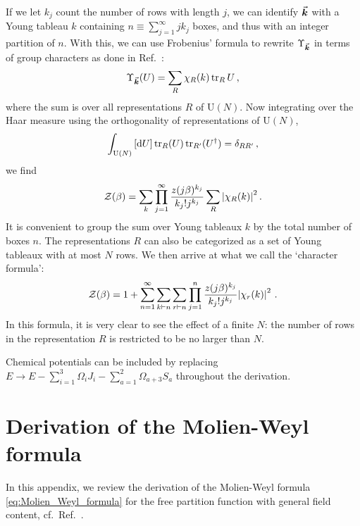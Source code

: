 \documentclass[a4paper,11pt]{article}
\begin{document}
If we let $k_j$ count the number of rows with length $j$, we can identify $\va*{k}$ with a Young tableau $k$ containing $n\equiv\sum_{j=1}^\infty j k_j$ boxes, and thus with an integer partition of $n$. With this, we can use Frobenius' formula to rewrite $\Upsilon_{\va*{k}}$ in terms of group characters as done in Ref.\ \cite{Dutta:2007ws}:
%
\begin{equation}
	\Upsilon_{\va*{k}}(U) = \sum_R \chi_R(k) \tr_R U \, ,
\end{equation}
%
where the sum is over all representations $R$ of $\text{U}(N)$. Now integrating over the Haar measure using the orthogonality of representations of $\text{U}(N)$,
%
\begin{equation}
	\int_{\text{U}(N)}\left[ \dd U\right] \tr_R (U) \tr_{R'} (U^\dag) = \delta_{RR'} \, ,
\end{equation}
%
we find
%
\begin{equation}
	\mathcal{Z}(\beta) = \sum_k \prod_{j=1}^\infty \frac{z(j\beta)^{k_j}}{k_j! j^{k_j}} \sum_R \abs{\chi_R(k)}^2 \, .
\end{equation}
%
It is convenient to group the sum over Young tableaux $k$ by the total number of boxes $n$. The representations $R$ can also be categorized as a set of Young tableaux with at most $N$ rows. We then arrive at what we call the `character formula':
%
\begin{equation}
	\mathcal{Z}(\beta) = 1 + \sum_{n=1}^\infty \sum_{k\vdash n} \sum_{r\vdash n} \prod_{j=1}^n \frac{z(j\beta)^{k_j}}{k_j! j^{k_j}} \abs{\chi_r(k)}^2 \ .
\end{equation}
%
In this formula, it is very clear to see the effect of a finite $N$: the number of rows in the representation $R$ is restricted to be no larger than $N$.

Chemical potentials can be included by replacing $E \to E -\sum_{i=1}^3 \Omega_i J_i- \sum_{a=1}^2 \Omega_{a+3} S_a$ throughout the derivation.


\section{Derivation of the Molien-Weyl formula} \label{app:deriv_Molien_Weyl_formula}

In this appendix, we review the derivation of the Molien-Weyl formula \eqref{eq:Molien_Weyl_formula} for the free partition function with general field content, cf.\ Ref.\ \cite{Dolan:2007rq}.
\end{document}
